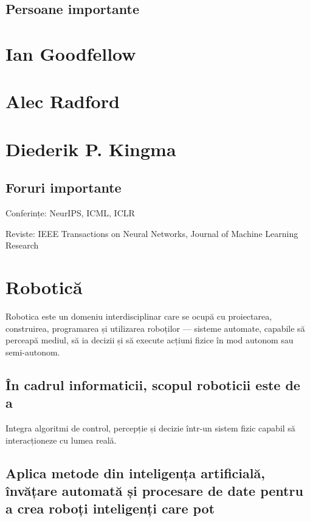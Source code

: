 \documentclass[12pt]{article}
\begin{document}
\subsection*{Persoane importante}

\section*{Ian Goodfellow}

\section*{Alec Radford}

\section*{Diederik P. Kingma}

\subsection*{Foruri importante}

Conferințe: NeurIPS, ICML, ICLR

Reviste: IEEE Transactions on Neural Networks, Journal of Machine Learning Research

\section*{Robotică}

Robotica este un domeniu interdisciplinar care se ocupă cu proiectarea, construirea, programarea și utilizarea roboților — sisteme automate, capabile să perceapă mediul, să ia decizii și să execute acțiuni fizice în mod autonom sau semi-autonom.

\subsection*{În cadrul informaticii, scopul roboticii este de a}

Integra algoritmi de control, percepție și decizie într-un sistem fizic capabil să interacționeze cu lumea reală.

\subsection*{Aplica metode din inteligența artificială, învățare automată și procesare de date pentru a crea roboți inteligenți care pot}
\end{document}
